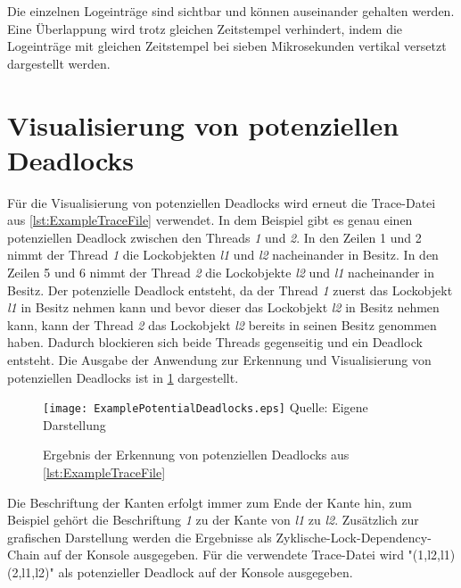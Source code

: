 Die einzelnen Logeinträge sind sichtbar und können auseinander gehalten werden.
Eine Überlappung wird trotz gleichen Zeitstempel verhindert, indem die
Logeinträge mit gleichen Zeitstempel bei sieben Mikrosekunden vertikal versetzt
dargestellt werden.

\section{Visualisierung von potenziellen Deadlocks}
\label{section:DeadlockVisualization}
Für die Visualisierung von potenziellen Deadlocks wird erneut die Trace-Datei
aus \cref{lst:ExampleTraceFile} verwendet. In dem Beispiel gibt es genau einen
potenziellen Deadlock zwischen den Threads \emph{1} und \emph{2}. In den Zeilen
1 und 2 nimmt der Thread \emph{1} die Lockobjekten \emph{l1} und \emph{l2}
nacheinander in Besitz. In den Zeilen 5 und 6 nimmt der Thread \emph{2} die
Lockobjekte \emph{l2} und \emph{l1} nacheinander in Besitz. Der potenzielle
Deadlock entsteht, da der Thread \emph{1} zuerst das Lockobjekt \emph{l1} in
Besitz nehmen kann und bevor dieser das Lockobjekt \emph{l2} in Besitz nehmen
kann, kann der Thread \emph{2} das Lockobjekt \emph{l2} bereits in seinen Besitz
genommen haben. Dadurch blockieren sich beide Threads gegenseitig und ein
Deadlock entsteht. Die Ausgabe der Anwendung zur Erkennung und Visualisierung
von potenziellen Deadlocks ist in \cref{fig:DeadlockVisualization} dargestellt.
\begin{figure}[ht]
  \texttt{[image: ExamplePotentialDeadlocks.eps]}
  \footnotesize\sffamily Quelle: Eigene Darstellung
  \caption{Ergebnis der Erkennung von potenziellen Deadlocks aus \cref{lst:ExampleTraceFile}}
  \label{fig:DeadlockVisualization}
\end{figure}
Die Beschriftung der Kanten erfolgt immer zum Ende der Kante hin, zum Beispiel
gehört die Beschriftung \emph{1} zu der Kante von \emph{l1} zu \emph{l2}.
Zusätzlich zur grafischen Darstellung werden die Ergebnisse als
Zyklische-Lock-Dependency-Chain auf der Konsole ausgegeben. Für die verwendete
Trace-Datei wird "(1,l2,{l1}) (2,l1,{l2})" als potenzieller Deadlock auf der
Konsole ausgegeben.